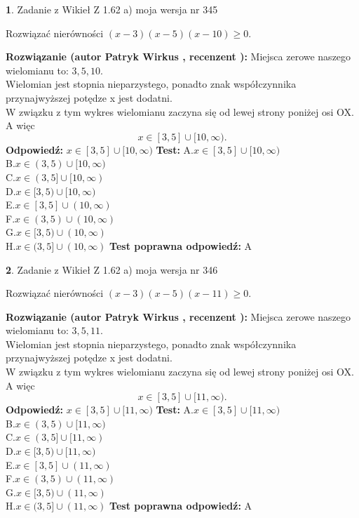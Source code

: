 \documentclass[12pt, a4paper]{article}
\theoremstyle{definition} %
\newtheorem{zad}{}
\newcommand{\zadStart}[1]{\begin{zad}#1\newline}
\newcommand{\zadStop}{\end{zad}}
\newcommand{\rozwStart}[2]{\noindent \textbf{Rozwiązanie (autor #1 , recenzent #2): }\newline}
\newcommand{\rozwStop}{\newline}
\newcommand{\odpStart}{\noindent \textbf{Odpowiedź:}\newline}
\newcommand{\odpStop}{\newline}
\newcommand{\testStart}{\noindent \textbf{Test:}\newline}
\newcommand{\testStop}{\newline}
\newcommand{\kluczStart}{\noindent \textbf{Test poprawna odpowiedź:}\newline}
\newcommand{\kluczStop}{\newline}
\begin{document}
\zadStart{Zadanie z Wikieł Z 1.62 a) moja wersja nr 345}

Rozwiązać nierówności $(x-3)(x-5)(x-10)\ge0$.
\zadStop
\rozwStart{Patryk Wirkus}{}
Miejsca zerowe naszego wielomianu to: $3, 5, 10$.\\
Wielomian jest stopnia nieparzystego, ponadto znak współczynnika przy\linebreak najwyższej potędze x jest dodatni.\\ W związku z tym wykres wielomianu zaczyna się od lewej strony poniżej osi OX. A więc $$x \in [3,5] \cup [10,\infty).$$
\rozwStop
\odpStart
$x \in [3,5] \cup [10,\infty)$
\odpStop
\testStart
A.$x \in [3,5] \cup [10,\infty)$\\
B.$x \in (3,5) \cup [10,\infty)$\\
C.$x \in (3,5] \cup [10,\infty)$\\
D.$x \in [3,5) \cup [10,\infty)$\\
E.$x \in [3,5] \cup (10,\infty)$\\
F.$x \in (3,5) \cup (10,\infty)$\\
G.$x \in [3,5) \cup (10,\infty)$\\
H.$x \in (3,5] \cup (10,\infty)$
\testStop
\kluczStart
A
\kluczStop



\zadStart{Zadanie z Wikieł Z 1.62 a) moja wersja nr 346}

Rozwiązać nierówności $(x-3)(x-5)(x-11)\ge0$.
\zadStop
\rozwStart{Patryk Wirkus}{}
Miejsca zerowe naszego wielomianu to: $3, 5, 11$.\\
Wielomian jest stopnia nieparzystego, ponadto znak współczynnika przy\linebreak najwyższej potędze x jest dodatni.\\ W związku z tym wykres wielomianu zaczyna się od lewej strony poniżej osi OX. A więc $$x \in [3,5] \cup [11,\infty).$$
\rozwStop
\odpStart
$x \in [3,5] \cup [11,\infty)$
\odpStop
\testStart
A.$x \in [3,5] \cup [11,\infty)$\\
B.$x \in (3,5) \cup [11,\infty)$\\
C.$x \in (3,5] \cup [11,\infty)$\\
D.$x \in [3,5) \cup [11,\infty)$\\
E.$x \in [3,5] \cup (11,\infty)$\\
F.$x \in (3,5) \cup (11,\infty)$\\
G.$x \in [3,5) \cup (11,\infty)$\\
H.$x \in (3,5] \cup (11,\infty)$
\testStop
\kluczStart
A
\kluczStop
\end{document}
